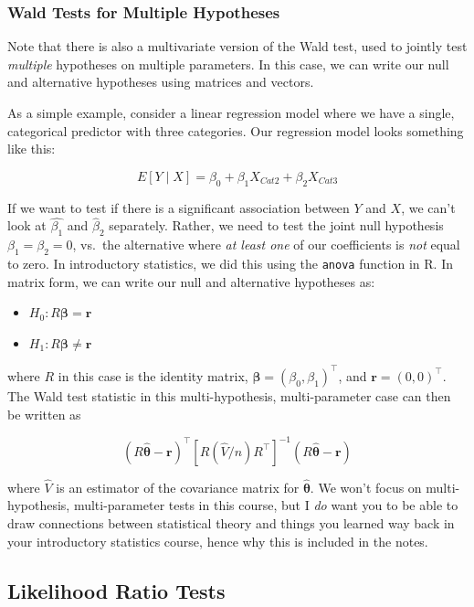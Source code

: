 \documentclass[
  letterpaper,
  DIV=11,
  numbers=noendperiod]{scrreprt}
\begin{document}
\subsubsection*{Wald Tests for Multiple
Hypotheses}\label{wald-tests-for-multiple-hypotheses}

Note that there is also a multivariate version of the Wald test, used to
jointly test \emph{multiple} hypotheses on multiple parameters. In this
case, we can write our null and alternative hypotheses using matrices
and vectors.

As a simple example, consider a linear regression model where we have a
single, categorical predictor with three categories. Our regression
model looks something like this:

\[
E[Y \mid X] = \beta_0 + \beta_1 X_{Cat2} + \beta_2 X_{Cat3}
\]

If we want to test if there is a significant association between \(Y\)
and \(X\), we can't look at \(\hat{\beta_1}\) and \(\hat{\beta}_2\)
separately. Rather, we need to test the joint null hypothesis
\(\beta_1 = \beta_2 = 0\), vs.~the alternative where \emph{at least one}
of our coefficients is \emph{not} equal to zero. In introductory
statistics, we did this using the \texttt{anova} function in R. In
matrix form, we can write our null and alternative hypotheses as:

\begin{itemize}
\item
  \(H_0: R \boldsymbol{\beta} = \textbf{r}\)
\item
  \(H_1: R \boldsymbol{\beta} \neq \textbf{r}\)
\end{itemize}

where \(R\) in this case is the identity matrix,
\(\boldsymbol{\beta} = (\beta_0, \beta_1)^\top\), and
\(\textbf{r} = (0,0)^\top\). The Wald test statistic in this
multi-hypothesis, multi-parameter case can then be written as

\[
(R\hat{\boldsymbol{\theta}} - \textbf{r})^\top [R (\hat{V}/n) R^\top]^{-1} (R\hat{\boldsymbol{\theta}} - \textbf{r})
\]

where \(\hat{V}\) is an estimator of the covariance matrix for
\(\hat{\boldsymbol{\theta}}\). We won't focus on multi-hypothesis,
multi-parameter tests in this course, but I \emph{do} want you to be
able to draw connections between statistical theory and things you
learned way back in your introductory statistics course, hence why this
is included in the notes.

\subsection*{Likelihood Ratio Tests}\label{likelihood-ratio-tests}
\end{document}
